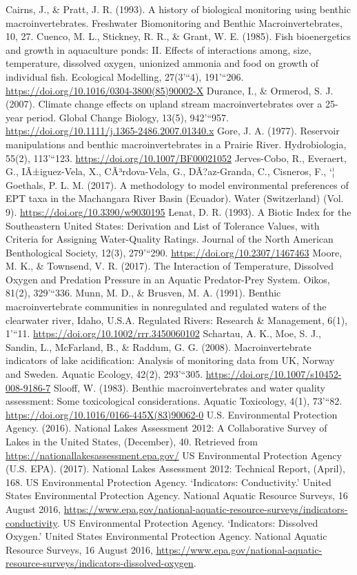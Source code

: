 \documentclass[]{article}
\begin{document}
Cairns, J., \& Pratt, J. R. (1993). A history of biological monitoring
using benthic macroinvertebrates. Freshwater Biomonitoring and Benthic
Macroinvertebrates, 10, 27. Cuenco, M. L., Stickney, R. R., \& Grant, W.
E. (1985). Fish bioenergetics and growth in aquaculture ponds: II.
Effects of interactions among, size, temperature, dissolved oxygen,
unionized ammonia and food on growth of individual fish. Ecological
Modelling, 27(3'``4), 191'``206.
\url{https://doi.org/10.1016/0304-3800(85)90002-X} Durance, I., \&
Ormerod, S. J. (2007). Climate change effects on upland stream
macroinvertebrates over a 25-year period. Global Change Biology, 13(5),
942'``957. \url{https://doi.org/10.1111/j.1365-2486.2007.01340.x} Gore,
J. A. (1977). Reservoir manipulations and benthic macroinvertebrates in
a Prairie River. Hydrobiologia, 55(2), 113'``123.
\url{https://doi.org/10.1007/BF00021052} Jerves-Cobo, R., Everaert, G.,
IÃ±iguez-Vela, X., CÃ³rdova-Vela, G., DÃ?az-Granda, C., Cisneros, F.,
`¦ Goethals, P. L. M. (2017). A methodology to model environmental
preferences of EPT taxa in the Machangara River Basin (Ecuador). Water
(Switzerland) (Vol. 9). \url{https://doi.org/10.3390/w9030195} Lenat, D.
R. (1993). A Biotic Index for the Southeastern United States: Derivation
and List of Tolerance Values, with Criteria for Assigning Water-Quality
Ratings. Journal of the North American Benthological Society, 12(3),
279'``290. \url{https://doi.org/10.2307/1467463} Moore, M. K., \&
Townsend, V. R. (2017). The Interaction of Temperature, Dissolved Oxygen
and Predation Pressure in an Aquatic Predator-Prey System. Oikos, 81(2),
329'``336. Munn, M. D., \& Brusven, M. A. (1991). Benthic
macroinvertebrate communities in nonregulated and regulated waters of
the clearwater river, Idaho, U.S.A. Regulated Rivers: Research \&
Management, 6(1), 1'``11. \url{https://doi.org/10.1002/rrr.3450060102}
Schartau, A. K., Moe, S. J., Sandin, L., McFarland, B., \& Raddum, G. G.
(2008). Macroinvertebrate indicators of lake acidification: Analysis of
monitoring data from UK, Norway and Sweden. Aquatic Ecology, 42(2),
293'``305. \url{https://doi.org/10.1007/s10452-008-9186-7} Slooff, W.
(1983). Benthic macroinvertebrates and water quality assessment: Some
toxicological considerations. Aquatic Toxicology, 4(1), 73'``82.
\url{https://doi.org/10.1016/0166-445X(83)90062-0} U.S. Environmental
Protection Agency. (2016). National Lakes Assessment 2012: A
Collaborative Survey of Lakes in the United States, (December), 40.
Retrieved from \url{https://nationallakesassessment.epa.gov/} US
Environmental Protection Agency (U.S. EPA). (2017). National Lakes
Assessment 2012: Technical Report, (April), 168. US Environmental
Protection Agency. `Indicators: Conductivity.' United States
Environmental Protection Agency. National Aquatic Resource Surveys, 16
August 2016,
\url{https://www.epa.gov/national-aquatic-resource-surveys/indicators-conductivity}.
US Environmental Protection Agency. `Indicators: Dissolved Oxygen.'
United States Environmental Protection Agency. National Aquatic Resource
Surveys, 16 August 2016,
\url{https://www.epa.gov/national-aquatic-resource-surveys/indicators-dissolved-oxygen}.
\end{document}
